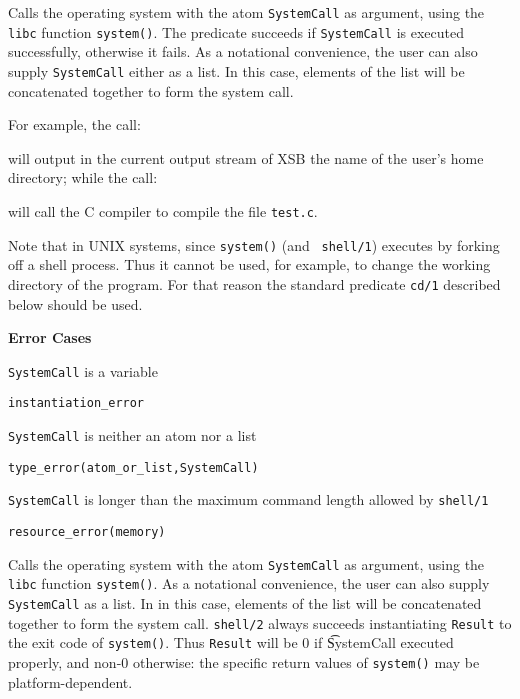 \begin{description}

%
Calls the operating system with the atom {\tt SystemCall} as argument,
using the {\tt libc} function {\tt system()}.  The predicate succeeds
if {\tt SystemCall} is executed successfully, otherwise it fails.  As
a notational convenience, the user can also supply {\tt SystemCall}
either as a list.  In this case, elements of the list will be
concatenated together to form the system call.

    For example, the call:


    \noindent
    will output in the current output stream of XSB the name of the
    user's home directory; while the call:


    \noindent
    will call the C compiler to compile the file {\tt test.c}.

    Note that in UNIX systems, since {\tt system()} (and {\tt
      shell/1}) executes by forking off a shell process.  Thus it
    cannot be used, for example, to change the working directory of
    the program.  For that reason the standard predicate {\tt cd/1}
    described below should be used.

{\bf Error Cases}
\bi
\item  {\tt SystemCall} is a variable
\bi
\item {\tt instantiation\_error}
\ei
\item {\tt SystemCall} is neither an atom nor a list
\bi
\item {\tt type\_error(atom\_or\_list,SystemCall)}
\ei
\item {\tt SystemCall} is longer than the maximum command length
  allowed by {\tt shell/1}
\bi
\item {\tt resource\_error(memory)}
\ei
\ei

%
Calls the operating system with the atom {\tt SystemCall} as argument,
using the {\tt libc} function {\tt system()}.  As a notational
convenience, the user can also supply {\tt SystemCall} as a list.  In
in this case, elements of the list will be concatenated together to
form the system call.  {\tt shell/2} always succeeds instantiating
{\tt Result} to the exit code of {\tt system()}.  Thus {\tt Result}
will be 0 if {\t SystemCall} executed properly, and non-0 otherwise:
the specific return values of {\tt system()} may be platform-dependent.


\end{description}
